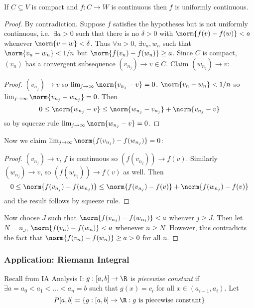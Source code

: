 \documentclass[a4paper]{article}
\theoremstyle{definition}
\begin{document}
\begin{theorem}
  If \(C \subseteq V\) is compact and \(f: C \to W\) is continuous then \(f\) is uniformly continuous.
\end{theorem}

\begin{proof}
  By contradiction. Suppose \(f\) satisfies the hypotheses but is not uniformly continuous, i.e.\ \(\exists a > 0\) such that there is no \(\delta > 0\) with \(\norm{f(v) - f (w)} < a\) whenever \(\norm{v - w} < \delta\). Thus \(\forall n > 0\), \(\exists v_n, w_n\) such that \(\norm{v_n - w_n} < 1/n\) but \(\norm{f(v_n) - f(w_n)} \geq a\). Since \(C\) is compact, \((v_n)\) has a convergent subsequence \((v_{n_j}) \to v \in C\). Claim \((w_{n_j}) \to v\):
  \begin{proof}
    \((v_{n_j}) \to  v\) so \(\lim_{j\to \infty}\norm{v_{n_j} - v} = 0\). \(\norm{v_n - w_n} < 1/n\) so \(\lim_{j\to \infty}\norm{v_{n_j} - w_{n_j}} = 0\). Then
    \[
      0 \leq \norm{w_{n_j} - v} \leq \norm{w_{n_j} - v_{n_j}} + \norm{v_{n_j} - v}
  \]
  so by squeeze rule \(\lim_{j\to \infty} \norm{w_{n_j} - v} = 0\).
  \end{proof}
  Now we claim \(\lim_{j\to \infty} \norm{f(v_{n_j}) - f(w_{n_j})} = 0\):
    \begin{proof}
      \((v_{n_j}) \to v\), \(f\) is continuous so \((f(v_{n_j})) \to f(v)\).
      Similarly \((w_{n_j}) \to v\), so \((f(w_{n_j})) \to f(v)\) as well. Then
      \[
        0 \leq \norm{f(v_{n_j}) - f(w_{n_j})} \leq \norm{f(v_{n_j}) - f(v)} + \norm{f(w_{n_j}) - f(v)}
      \]
      and the result follows by squeeze rule.
    \end{proof}
    Now choose \(J\) such that \(\norm{f(v_{n_j}) - f(w_{n_j})} < a\) whenver \(j \geq J\). Then let \(N = n_J\), \(\norm{f(v_n) - f(w_n)} < a\) whenever \(n \geq N\). However, this contradicts the fact that \(\norm{f(v_n) - f(w_n)} \geq a > 0\) for all \(n\).
\end{proof}

\subsubsection{Application: Riemann Integral}

Recall from IA Analysis I: \(g: [a, b] \to \R \) is \emph{piecewise constant} if \(\exists a = a_0 < a_1 < \dots < a_n = b\) such that \(g(x) = c_i\) for all \(x\in (a_{i-1}, a_i)\). Let
\[
  P[a, b] = \{g: [a, b] \to \R: g \text{ is piecewise constant} \}
\]
\end{document}
